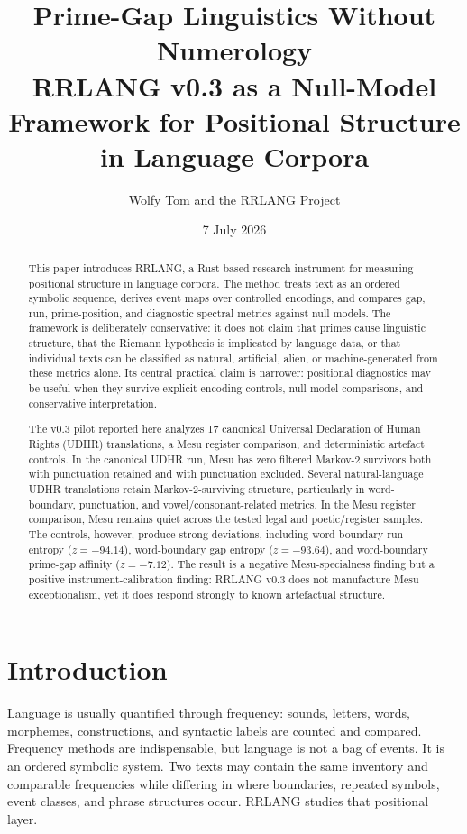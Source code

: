 \documentclass[11pt,a4paper]{article}
\title{\textbf{Prime-Gap Linguistics Without Numerology}\\\large RRLANG v0.3 as a Null-Model Framework for Positional Structure in Language Corpora}
\author{Wolfy Tom and the RRLANG Project}
\date{7 July 2026}
\newcommand{\RRLANG}{\textsc{RRLANG}}
\begin{document}
\maketitle

\begin{abstract}
This paper introduces \RRLANG, a Rust-based research instrument for measuring positional structure in language corpora. The method treats text as an ordered symbolic sequence, derives event maps over controlled encodings, and compares gap, run, prime-position, and diagnostic spectral metrics against null models. The framework is deliberately conservative: it does not claim that primes cause linguistic structure, that the Riemann hypothesis is implicated by language data, or that individual texts can be classified as natural, artificial, alien, or machine-generated from these metrics alone. Its central practical claim is narrower: positional diagnostics may be useful when they survive explicit encoding controls, null-model comparisons, and conservative interpretation.

The v0.3 pilot reported here analyzes 17 canonical Universal Declaration of Human Rights (UDHR) translations, a Mesu register comparison, and deterministic artefact controls. In the canonical UDHR run, Mesu has zero filtered Markov-2 survivors both with punctuation retained and with punctuation excluded. Several natural-language UDHR translations retain Markov-2-surviving structure, particularly in word-boundary, punctuation, and vowel/consonant-related metrics. In the Mesu register comparison, Mesu remains quiet across the tested legal and poetic/register samples. The controls, however, produce strong deviations, including word-boundary run entropy ($z=-94.14$), word-boundary gap entropy ($z=-93.64$), and word-boundary prime-gap affinity ($z=-7.12$). The result is a negative Mesu-specialness finding but a positive instrument-calibration finding: \RRLANG{} v0.3 does not manufacture Mesu exceptionalism, yet it does respond strongly to known artefactual structure.
\end{abstract}


\section{Introduction}
Language is usually quantified through frequency: sounds, letters, words, morphemes, constructions, and syntactic labels are counted and compared. Frequency methods are indispensable, but language is not a bag of events. It is an ordered symbolic system. Two texts may contain the same inventory and comparable frequencies while differing in where boundaries, repeated symbols, event classes, and phrase structures occur. \RRLANG{} studies that positional layer.
\end{document}
